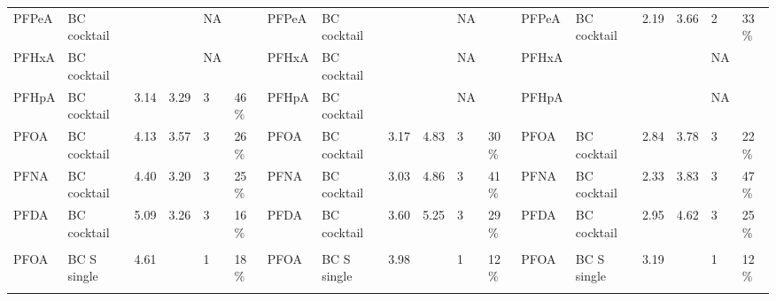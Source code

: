 \begin{sidewaystable}
{\begin{threeparttable}
\begin{tabular}{llllllllllllllllll}
PFPeA    & BC cocktail   &        &           & NA &                                & PFPeA    & BC cocktail   &        &           & NA &                                & PFPeA    & BC cocktail   & 2.19   & 3.66      & 2  & 33 \%                          \\
PFHxA    & BC cocktail   &        &           & NA &                                & PFHxA    & BC cocktail   &        &           & NA &                                & PFHxA    &               &        &           & NA &                                \\
PFHpA    & BC cocktail   & 3.14   & 3.29      & 3  & 46 \%                          & PFHpA    & BC cocktail   &        &           & NA &                                & PFHpA    &               &        &           & NA &                                \\
PFOA     & BC cocktail   & 4.13   & 3.57      & 3  & 26 \%                          & PFOA     & BC cocktail   & 3.17   & 4.83      & 3  & 30 \%                          & PFOA     & BC cocktail   & 2.84   & 3.78      & 3  & 22 \%                          \\
PFNA     & BC cocktail   & 4.40   & 3.20      & 3  & 25 \%                          & PFNA     & BC cocktail   & 3.03   & 4.86      & 3  & 41 \%                          & PFNA     & BC cocktail   & 2.33   & 3.83      & 3  & 47 \%                          \\
PFDA     & BC cocktail   & 5.09   & 3.26      & 3  & 16 \%                          & PFDA     & BC cocktail   & 3.60   & 5.25      & 3  & 29 \%                          & PFDA     & BC cocktail   & 2.95   & 4.62      & 3  & 25 \%                          \\
         &                &        &           &    &                                &          &                &        &           &    &                                &          &                &        &           &    &                                \\
PFOA     & BC S single    & 4.61   &           & 1  & 18 \%                          & PFOA     & BC S single    & 3.98   &           & 1  & 12 \%                          & PFOA     & BC S single    & 3.19   &           & 1  & 12 \%                          \\ \midrule
         &                &        &           &    &                                &          &                &        &           &    &                                &          &                &        &           &    &                                \\

\end{tabular}
\end{threeparttable}}
\end{sidewaystable}
